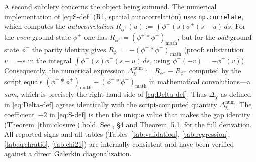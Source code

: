 \documentclass[a4paper,10pt,twocolumn]{article}
\theoremstyle{definition}
\theoremstyle{remark}
\newcommand{\chifn}{\chi}
\newcommand{\Deltachi}{\Delta_{\chifn}}
\begin{document}
A second subtlety concerns the object being summed. The numerical
implementation of \eqref{eq:S-def} (R1, spatial autocorrelation)
uses \texttt{np.correlate}, which computes the \emph{autocorrelation}
$R_{\phi^\pm}(u):=\int\phi^\pm(s)\phi^\pm(s-u)\,ds$.
For the \emph{even} ground state $\phi^+$ one has
$R_{\phi^+}=(\phi^+{*}\phi^+)_{\mathrm{math}}$, but for the
\emph{odd} ground state $\phi^-$ the parity identity gives
$R_{\phi^-}=-(\phi^-{*}\phi^-)_{\mathrm{math}}$ (proof: substitution
$v=-s$ in the integral $\int\phi^-(s)\phi^-(s-u)\,ds$, using
$\phi^-(-v)=-\phi^-(v)$). Consequently, the numerical expression
$\Deltachi^{\mathrm{num}}:=R_{\phi^+}-R_{\phi^-}$ computed by the
script equals
$(\phi^+{*}\phi^+)_{\mathrm{math}}+(\phi^-{*}\phi^-)_{\mathrm{math}}$
in mathematical convolutions---a \emph{sum}, which is precisely the
right-hand side of \eqref{eq:Delta-def}. Thus $\Deltachi$ as defined
in \eqref{eq:Delta-def} agrees identically with the script-computed
quantity $\Deltachi^{\mathrm{num}}$. The coefficient~$-2$ in
\eqref{eq:S-def} is then the unique value that makes the gap
identity (Theorem~\ref{thm:closure}) hold. See
\cite{AnalyticKernelV2}, \S4 and Theorem~5.1, for the full
derivation. All reported signs and all tables
(Tables~\ref{tab:validation}, \ref{tab:regression},
\ref{tab:archratio}, \ref{tab:chi21}) are internally consistent
and have been verified against a direct Galerkin diagonalization.
\end{document}
